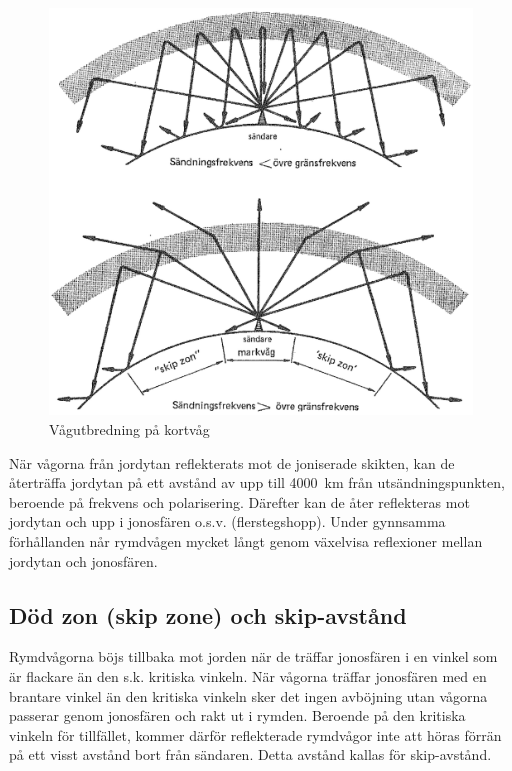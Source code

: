 \begin{figure}
  \includegraphics[width=\textwidth]{images/cropped_pdfs/bild_2_7-11.pdf}
  \caption{Vågutbredning på kortvåg}
  \label{fig:bildII7-11}
\end{figure}

När vågorna från jordytan reflekterats mot de joniserade skikten, kan
de återträffa jordytan på ett avstånd av upp till 4000~km från
utsändningspunkten, beroende på frekvens och polarisering. Därefter
kan de åter reflekteras mot jordytan och upp i jonosfären
o.s.v. (flerstegshopp). Under gynnsamma förhållanden når rymdvågen
mycket långt genom växelvisa reflexioner mellan jordytan och
jonosfären.

\subsection{Död zon (skip zone) och skip-avstånd}

Rymdvågorna böjs tillbaka mot jorden när de träffar jonosfären i en
vinkel som är flackare än den s.k. kritiska vinkeln. När vågorna
träffar jonosfären med en brantare vinkel än den kritiska vinkeln sker
det ingen avböjning utan vågorna passerar genom jonosfären och rakt ut
i rymden. Beroende på den kritiska vinkeln för tillfället, kommer
därför reflekterade rymdvågor inte att höras förrän på ett visst
avstånd bort från sändaren. Detta avstånd kallas för skip-avstånd.

